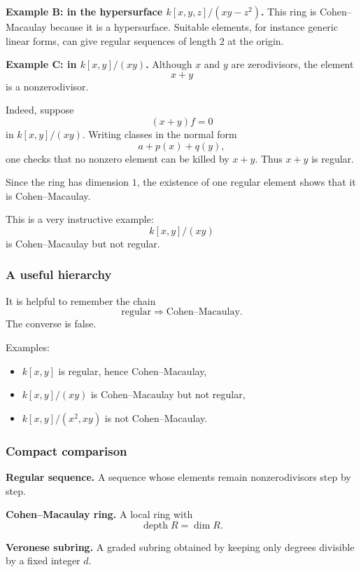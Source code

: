 \documentclass[12pt,a4paper]{article}
\theoremstyle{notespace}
\DeclareMathOperator{\depth}{depth}
\begin{document}
\medskip

\textbf{Example B: in the hypersurface \(k[x,y,z]/(xy-z^2)\).}
This ring is Cohen--Macaulay because it is a hypersurface. Suitable elements, for instance generic linear forms, can give regular sequences of length \(2\) at the origin.

\medskip

\textbf{Example C: in \(k[x,y]/(xy)\).}
Although \(x\) and \(y\) are zerodivisors, the element
\[
x+y
\]
is a nonzerodivisor.

Indeed, suppose
\[
(x+y)f=0
\]
in \(k[x,y]/(xy)\). Writing classes in the normal form
\[
a+p(x)+q(y),
\]
one checks that no nonzero element can be killed by \(x+y\). Thus \(x+y\) is regular.

Since the ring has dimension \(1\), the existence of one regular element shows that it is Cohen--Macaulay.

This is a very instructive example:
\[
k[x,y]/(xy)
\]
is Cohen--Macaulay but not regular.

\subsubsection{A useful hierarchy}

It is helpful to remember the chain
\[
\text{regular} \Longrightarrow \text{Cohen--Macaulay}.
\]
The converse is false.

Examples:
\begin{itemize}
	\item \(k[x,y]\) is regular, hence Cohen--Macaulay,
	\item \(k[x,y]/(xy)\) is Cohen--Macaulay but not regular,
	\item \(k[x,y]/(x^2,xy)\) is not Cohen--Macaulay.
\end{itemize}

\subsubsection{Compact comparison}

\textbf{Regular sequence.}
A sequence whose elements remain nonzerodivisors step by step.

\medskip

\textbf{Cohen--Macaulay ring.}
A local ring with
\[
\depth R=\dim R.
\]

\medskip

\textbf{Veronese subring.}
A graded subring obtained by keeping only degrees divisible by a fixed integer \(d\).
\end{document}
